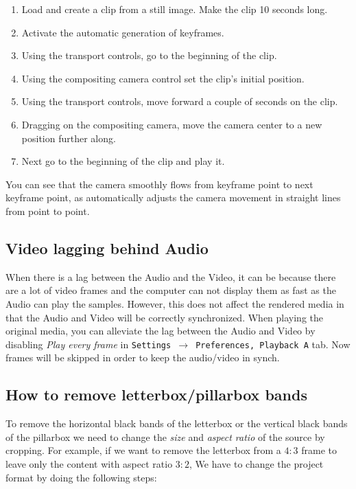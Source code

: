 \begin{enumerate}
	\item Load and create a clip from a still image. Make the clip 10 seconds long.
	\item Activate the automatic generation of keyframes.
	\item Using the transport controls, go to the beginning of the clip.
	\item Using the compositing camera control set the clip's initial position.
	\item Using the transport controls, move forward a couple of seconds on the clip.
	\item Dragging on the compositing camera, move the camera center to a new position further along.
	\item Next go to the beginning of the clip and play it.
\end{enumerate}

You can see that the camera smoothly flows from keyframe point to next keyframe point, as \CGG{} automatically adjusts the camera movement in straight lines from point to point.

\subsection{Video lagging behind Audio}%
\label{sub:video_lagging}

When there is a lag between the Audio and the Video, it can be because there are a lot of video frames
and the computer can not display them as fast as the Audio can play the samples.  However, this does
not affect the rendered media in that the Audio and Video will be correctly synchronized. When playing
the original media, you can alleviate the lag between the Audio and Video by disabling
\textit{Play every frame} in \texttt{Settings $\rightarrow$ Preferences, Playback A} tab.  Now frames
will be skipped in order to keep the audio/video in synch.

\subsection{How to remove letterbox/pillarbox bands}%
\label{sub:remove_letterbox}

To remove the horizontal black bands of the letterbox or the vertical
black bands of the pillarbox we need to change the \textit{size} and
\textit{aspect ratio} of the source by cropping.
For example, if we want to remove the letterbox from a $4:3$ frame to
leave only the content with aspect ratio $3:2$, We have to change the
project format by doing the following steps:

